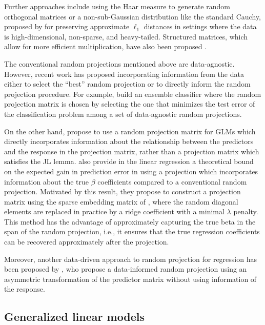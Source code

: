 \documentclass[
  article]{jss}
\begin{document}
Further approaches include using the Haar measure to generate random
orthogonal matrices \citep{cannings2017random} or a non-sub-Gaussian
distribution like the standard Cauchy, proposed by
\citet{LiHastie2006VerySparseRP} for preserving approximate \(\ell_1\)
distances in settings where the data is high-dimensional, non-sparse,
and heavy-tailed. Structured matrices, which allow for more efficient
multiplication, have also been proposed \citep[see
e.g.,][]{ailon2009fast, Clarkson2013LowRankApprox}.

The conventional random projections mentioned above are data-agnostic.
However, recent work has proposed incorporating information from the
data either to select the ``best'' random projection or to directly
inform the random projection procedure. For example,
\citet{cannings2017random} build an ensemble classifier where the random
projection matrix is chosen by selecting the one that minimizes the test
error of the classification problem among a set of data-agnostic random
projections.

On the other hand, \citet{parzer2024glms} propose to use a random
projection matrix for GLMs which directly incorporates information about
the relationship between the predictors and the response in the
projection matrix, rather than a projection matrix which satisfies the
JL lemma. \citet{parzer2024sparse} also provide in the linear regression
a theoretical bound on the expected gain in prediction error in using a
projection which incorporates information about the true \(\beta\)
coefficients compared to a conventional random projection. Motivated by
this result, they propose to construct a projection matrix using the
sparse embedding matrix of \citet{Clarkson2013LowRankApprox}, where the
random diagonal elements are replaced in practice by a ridge coefficient
with a minimal \(\lambda\) penalty. This method has the advantage of
approximately capturing the true beta in the span of the random
projection, i.e., it ensures that the true regression coefficients can
be recovered approximately after the projection.

Moreover, another data-driven approach to random projection for
regression has been proposed by \citet{ryder2019asymmetric}, who propose
a data-informed random projection using an asymmetric transformation of
the predictor matrix without using information of the response.

\subsection{Generalized linear models}\label{generalized-linear-models}
\end{document}
